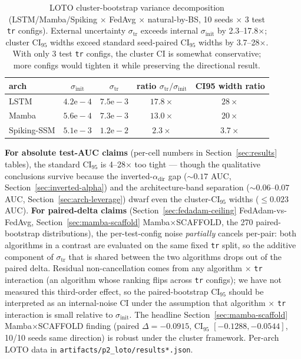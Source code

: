 \documentclass[journal]{IEEEtran}
\newcommand{\alphadir}{\ensuremath{\alpha_{\mathrm{dir}}}}
\begin{document}
\begin{itemize}
\begin{table}[t]
\caption{LOTO cluster-bootstrap variance decomposition (LSTM/Mamba/Spiking $\times$ FedAvg $\times$ natural-by-BS, 10 seeds $\times$ 3 test \lstinline|tr| configs). External uncertainty $\sigma_{\mathrm{tr}}$ exceeds internal $\sigma_{\mathrm{init}}$ by 2.3--17.8$\times$; cluster CI$_{95}$ widths exceed standard seed-paired CI$_{95}$ widths by 3.7--28$\times$. With only 3 test \lstinline|tr| configs, the cluster CI is somewhat conservative; more configs would tighten it while preserving the directional result.}
\label{tab:loto-variance}
\centering
\begin{tabular}{@{}lcccc@{}}
\toprule
arch & $\sigma_{\mathrm{init}}$ & $\sigma_{\mathrm{tr}}$ & ratio $\sigma_{\mathrm{tr}}/\sigma_{\mathrm{init}}$ & CI95 width ratio \\
\midrule
LSTM        & $4.2\mathrm{e}{-}4$ & $7.5\mathrm{e}{-}3$ & $17.8\times$ & $28\times$ \\
Mamba       & $5.6\mathrm{e}{-}4$ & $7.3\mathrm{e}{-}3$ & $13.0\times$ & $20\times$ \\
Spiking-SSM & $5.1\mathrm{e}{-}3$ & $1.2\mathrm{e}{-}2$ & $2.3\times$  & $3.7\times$ \\
\bottomrule
\end{tabular}
\end{table}

\textbf{For absolute test-AUC claims} (per-cell numbers in Section~\ref{sec:results} tables), the standard CI$_{95}$ is 4--28$\times$ too tight --- though the qualitative conclusions survive because the inverted-$\alphadir$ gap ($\sim 0.17$ AUC, Section~\ref{sec:inverted-alpha}) and the architecture-band separation ($\sim 0.06$--$0.07$ AUC, Section~\ref{sec:arch-leverage}) dwarf even the cluster-CI$_{95}$ widths ($\leq 0.023$ AUC). \textbf{For paired-delta claims} (Section~\ref{sec:fedadam-ceiling} FedAdam-vs-FedAvg, Section~\ref{sec:mamba-scaffold} Mamba$\times$SCAFFOLD, the 270 paired-bootstrap distributions), the per-test-config noise \emph{partially} cancels per-pair: both algorithms in a contrast are evaluated on the same fixed \lstinline|tr| split, so the additive component of $\sigma_{\mathrm{tr}}$ that is shared between the two algorithms drops out of the paired delta. Residual non-cancellation comes from any algorithm $\times$ \lstinline|tr| interaction (an algorithm whose ranking flips across \lstinline|tr| configs); we have not measured this third-order effect, so the paired-bootstrap CI$_{95}$ should be interpreted as an internal-noise CI under the assumption that algorithm $\times$ \lstinline|tr| interaction is small relative to $\sigma_{\mathrm{init}}$. The headline Section~\ref{sec:mamba-scaffold} Mamba$\times$SCAFFOLD finding (paired $\Delta = -0.0915$, CI$_{95}$ $[-0.1288, -0.0544]$, 10/10 seeds same direction) is robust under the cluster framework. Per-arch LOTO data in \lstinline|artifacts/p2_loto/results*.json|.


\end{itemize}
\end{document}
